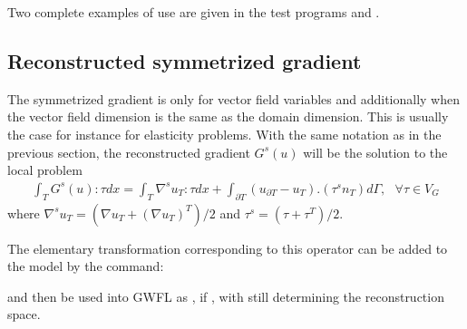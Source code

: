 \documentclass[a4paper,11pt,english]{sphinxmanual}
\begin{document}
Two complete examples of use are given in the test programs  and .


\subsection{Reconstructed symmetrized gradient}
\label{\detokenize{userdoc/hho:reconstructed-symmetrized-gradient}}
The symmetrized gradient is only for vector field variables and additionally when the vector field dimension is the same as the domain dimension. This is usually the case for instance for elasticity problems. With the same notation as in the previous section, the reconstructed gradient \(G^s(u)\) will be the solution to the local problem
\begin{equation*}
\begin{split}\int_T G^s(u):\tau dx = \int_T \nabla^s u_T : \tau dx + \int_{\partial T} (u_{\partial T} - u_{T}).(\tau^s n_T) d\Gamma, ~~~ \forall \tau \in V_G\end{split}
\end{equation*}
where \(\nabla^s u_T = (\nabla u_T + (\nabla u_T)^T)/2\) and \(\tau^s = (\tau + \tau^T)/2\).

The elementary transformation corresponding to this operator can be added to the model by the command:

\begin{sphinxVerbatim}[commandchars=\\\{\}]
 
\end{sphinxVerbatim}

and then be used into GWFL as , if , with  still determining the reconstruction space.
\end{document}
